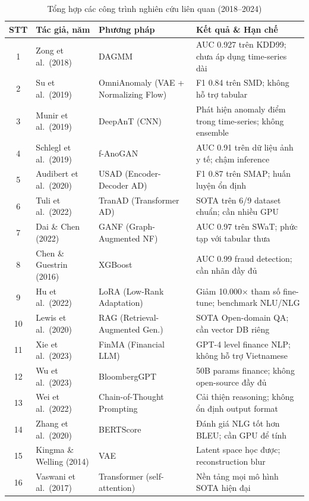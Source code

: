 \begin{table}[h!]
\centering
\fontsize{11pt}{13pt}\selectfont
\caption{Tổng hợp các công trình nghiên cứu liên quan (2018--2024)}
\label{tab:related_work}
\begin{tabularx}{\textwidth}{|c|>{\raggedright\arraybackslash}p{3.2cm}|>{\raggedright\arraybackslash}p{2.8cm}|>{\raggedright\arraybackslash}X|}
\hline
\textbf{STT} & \textbf{Tác giả, năm} & \textbf{Phương pháp} & \textbf{Kết quả \& Hạn chế} \\
\hline
1 & Zong et al.\ (2018) \cite{zong2018dagmm} & DAGMM & AUC 0.927 trên KDD99; chưa áp dụng time-series dài \\
\hline
2 & Su et al.\ (2019) \cite{su2019omni} & OmniAnomaly (VAE + Normalizing Flow) & F1 0.84 trên SMD; không hỗ trợ tabular \\
\hline
3 & Munir et al.\ (2019) \cite{munir2019deepant} & DeepAnT (CNN) & Phát hiện anomaly điểm trong time-series; không ensemble \\
\hline
4 & Schlegl et al.\ (2019) \cite{schlegl2019anogan} & f-AnoGAN & AUC 0.91 trên dữ liệu ảnh y tế; chậm inference \\
\hline
5 & Audibert et al.\ (2020) \cite{audibert2020usad} & USAD (Encoder-Decoder AD) & F1 0.87 trên SMAP; huấn luyện ổn định \\
\hline
6 & Tuli et al.\ (2022) \cite{tuli2022tranad} & TranAD (Transformer AD) & SOTA trên 6/9 dataset chuẩn; cần nhiều GPU \\
\hline
7 & Dai \& Chen (2022) \cite{dai2022ganf} & GANF (Graph-Augmented NF) & AUC 0.97 trên SWaT; phức tạp với tabular thưa \\
\hline
8 & Chen \& Guestrin (2016) \cite{chen2016xgboost} & XGBoost & AUC 0.99 fraud detection; cần nhãn đầy đủ \\
\hline
9 & Hu et al.\ (2022) \cite{hu2022lora} & LoRA (Low-Rank Adaptation) & Giảm 10.000× tham số fine-tune; benchmark NLU/NLG \\
\hline
10 & Lewis et al.\ (2020) \cite{lewis2020rag} & RAG (Retrieval-Augmented Gen.) & SOTA Open-domain QA; cần vector DB riêng \\
\hline
11 & Xie et al.\ (2023) \cite{xie2023finma} & FinMA (Financial LLM) & GPT-4 level finance NLP; không hỗ trợ Vietnamese \\
\hline
12 & Wu et al.\ (2023) \cite{wu2023bloomberggpt} & BloombergGPT & 50B params finance; không open-source đầy đủ \\
\hline
13 & Wei et al.\ (2022) \cite{wei2022chain} & Chain-of-Thought Prompting & Cải thiện reasoning; không ổn định output format \\
\hline
14 & Zhang et al.\ (2020) \cite{zhang2020bertscore} & BERTScore & Đánh giá NLG tốt hơn BLEU; cần GPU để tính \\
\hline
15 & Kingma \& Welling (2014) \cite{kingma2014vae} & VAE & Latent space học được; reconstruction blur \\
\hline
16 & Vaswani et al.\ (2017) \cite{vaswani2017attention} & Transformer (self-attention) & Nền tảng mọi mô hình SOTA hiện đại \\
\hline
\end{tabularx}
\end{table}

